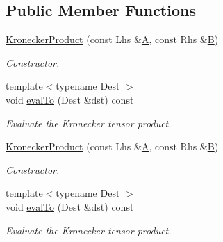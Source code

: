 \subsection*{Public Member Functions}
\begin{DoxyCompactItemize}
\item 
\mbox{\label{class_eigen_1_1_kronecker_product_a0b01b6d5ae2413cef8fd91fe7a98a0d7}} 
\hyperlink{class_eigen_1_1_kronecker_product_a0b01b6d5ae2413cef8fd91fe7a98a0d7}{Kronecker\+Product} (const Lhs \&\hyperlink{group___core___module_class_eigen_1_1_matrix}{A}, const Rhs \&\hyperlink{group___core___module_class_eigen_1_1_matrix}{B})
\begin{DoxyCompactList}\small\item\em Constructor. \end{DoxyCompactList}\item 
\mbox{\label{class_eigen_1_1_kronecker_product_a10f65aca36ed69da354e70b300b5a223}} 
{\footnotesize template$<$typename Dest $>$ }\\void \hyperlink{class_eigen_1_1_kronecker_product_a10f65aca36ed69da354e70b300b5a223}{eval\+To} (Dest \&dst) const
\begin{DoxyCompactList}\small\item\em Evaluate the Kronecker tensor product. \end{DoxyCompactList}\item 
\mbox{\label{class_eigen_1_1_kronecker_product_a0b01b6d5ae2413cef8fd91fe7a98a0d7}} 
\hyperlink{class_eigen_1_1_kronecker_product_a0b01b6d5ae2413cef8fd91fe7a98a0d7}{Kronecker\+Product} (const Lhs \&\hyperlink{group___core___module_class_eigen_1_1_matrix}{A}, const Rhs \&\hyperlink{group___core___module_class_eigen_1_1_matrix}{B})
\begin{DoxyCompactList}\small\item\em Constructor. \end{DoxyCompactList}\item 
\mbox{\label{class_eigen_1_1_kronecker_product_a10f65aca36ed69da354e70b300b5a223}} 
{\footnotesize template$<$typename Dest $>$ }\\void \hyperlink{class_eigen_1_1_kronecker_product_a10f65aca36ed69da354e70b300b5a223}{eval\+To} (Dest \&dst) const
\begin{DoxyCompactList}\small\item\em Evaluate the Kronecker tensor product. \end{DoxyCompactList}\end{DoxyCompactItemize}
